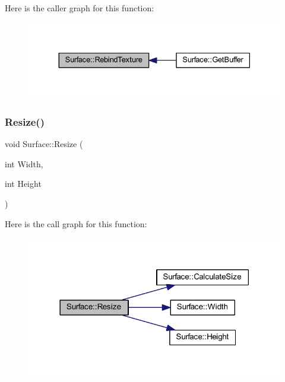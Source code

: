 Here is the caller graph for this function\+:
\nopagebreak
\begin{figure}[H]
\begin{center}
\leavevmode
\includegraphics[width=330pt]{class_surface_aa75c49f53fec5c49ba8422c0d64815e6_icgraph}
\end{center}
\end{figure}
\mbox{\label{class_surface_a5e45e936e3057fa1ddad0c7924767005}} 
\subsubsection{\texorpdfstring{Resize()}{Resize()}}
{\footnotesize\ttfamily void Surface\+::\+Resize (\begin{DoxyParamCaption}\item[{int}]{Width,  }\item[{int}]{Height }\end{DoxyParamCaption})}

Here is the call graph for this function\+:
\nopagebreak
\begin{figure}[H]
\begin{center}
\leavevmode
\includegraphics[width=318pt]{class_surface_a5e45e936e3057fa1ddad0c7924767005_cgraph}
\end{center}
\end{figure}
\mbox{\label{class_surface_a377c59f6ef131d4b879cda93578a3efa}} 

